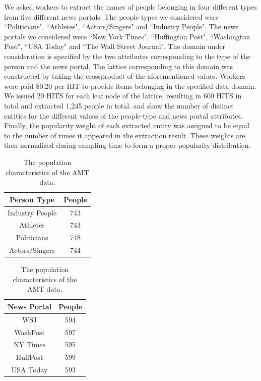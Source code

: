 \documentclass{vldb}
\begin{document}
We asked workers to extract the names of people belonging in four different types from five different news portals. The people types we considered were ``Politicians", ``Athletes", ``Actors/Singers" and ``Industry People". The news portals we considered were ``New York Times", ``Huffington Post", ``Washington Post", ``USA  Today" and ``The Wall Street Journal". The domain under consideration is specified by the two attributes corresponding to the type of the person and the news portal. The lattice corresponding to this domain was constructed by taking the crossproduct of the aforementioned values. Workers were paid \$0.20 per HIT to provide items belonging in the specified data domain. We issued 20 HITS for each leaf node of the lattice, resulting in 600 HITS in total and extracted 1,245 people in total.  and  show the number of distinct entities for the different values of the people-type and news portal attributes. Finally, the popularity weight of each extracted entity was assigned to be equal to the number of times it appeared in the extraction result. These weights are then normalized during sampling time to form a proper popularity distribution.

\begin{table}
\center
\caption{The population characteristics of the AMT data.}
\label{tab:ptypedata}
\begin{tabular}{|c|c|}
\hline
\textbf{Person Type} & \textbf{People} \\ \hline
Industry People & 743 \\
Athletes & 743 \\
Politicians & 748 \\
Actors/Singers & 744 \\ \hline \hline
\end{tabular}
\end{table}


\begin{table}
\center
\caption{The population characteristics of the AMT data.}
\label{tab:ntypedata}
\begin{tabular}{|c|c|}
\hline
\textbf{News Portal} & \textbf{People} \\ \hline
WSJ & 594 \\
WashPost & 597 \\
NY Times & 595 \\
HuffPost & 599 \\
USA Today & 593 \\ \hline
\end{tabular}
\end{table}
\end{document}
